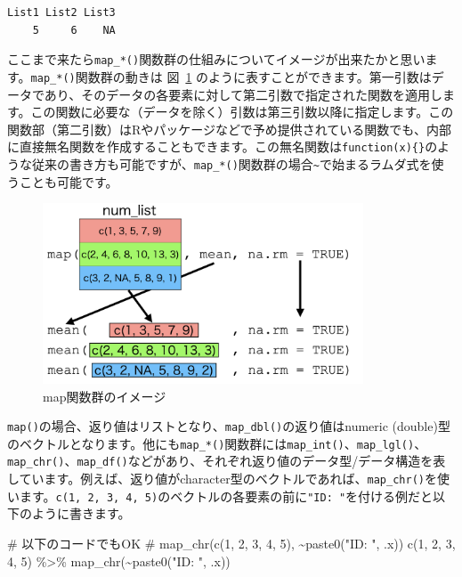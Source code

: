 \documentclass[
  a4paper,
  pandoc,
  ja=standard,
  jafont=haranoaji]{bxjsbook}
\newenvironment{Shaded}{\begin{snugshade}}{\end{snugshade}}
\newcommand{\CommentTok}[1]{\textcolor[rgb]{0.37,0.37,0.37}{#1}}
\newcommand{\DecValTok}[1]{\textcolor[rgb]{0.68,0.00,0.00}{#1}}
\newcommand{\FunctionTok}[1]{\textcolor[rgb]{0.28,0.35,0.67}{#1}}
\newcommand{\NormalTok}[1]{\textcolor[rgb]{0.00,0.48,0.65}{#1}}
\newcommand{\SpecialCharTok}[1]{\textcolor[rgb]{0.37,0.37,0.37}{#1}}
\newcommand{\StringTok}[1]{\textcolor[rgb]{0.13,0.47,0.30}{#1}}
\begin{document}
\begin{verbatim}
List1 List2 List3 
    5     6    NA 
\end{verbatim}

ここまで来たら\texttt{map\_*()}関数群の仕組みについてイメージが出来たかと思います。\texttt{map\_*()}関数群の動きは
図~\ref{fig-map_inside}
のように表すことができます。第一引数はデータであり、そのデータの各要素に対して第二引数で指定された関数を適用します。この関数に必要な（データを除く）引数は第三引数以降に指定します。この関数部（第二引数）はRやパッケージなどで予め提供されている関数でも、内部に直接無名関数を作成することもできます。この無名関数は\texttt{function(x)\{\}}のような従来の書き方も可能ですが、\texttt{map\_*()}関数群の場合\texttt{\textasciitilde{}}で始まるラムダ式を使うことも可能です。

\begin{figure}

{\centering \includegraphics[width=0.85\textwidth,height=\textheight]{./Figs/Iteration/map_inside.png}

}

\caption{\label{fig-map_inside}map関数群のイメージ}

\end{figure}

\texttt{map()}の場合、返り値はリストとなり、\texttt{map\_dbl()}の返り値はnumeric
(double)型のベクトルとなります。他にも\texttt{map\_*()}関数群には\texttt{map\_int()}、\texttt{map\_lgl()}、\texttt{map\_chr()}、\texttt{map\_df()}などがあり、それぞれ返り値のデータ型/データ構造を表しています。例えば、返り値がcharacter型のベクトルであれば、\texttt{map\_chr()}を使います。\texttt{c(1,\ 2,\ 3,\ 4,\ 5)}のベクトルの各要素の前に\texttt{"ID:\ "}を付ける例だと以下のように書きます。

\begin{Shaded}
\begin{Highlighting}[numbers=left,,]
\CommentTok{\# 以下のコードでもOK}
\CommentTok{\# map\_chr(c(1, 2, 3, 4, 5), \textasciitilde{}paste0("ID: ", .x))}
\FunctionTok{c}\NormalTok{(}\DecValTok{1}\NormalTok{, }\DecValTok{2}\NormalTok{, }\DecValTok{3}\NormalTok{, }\DecValTok{4}\NormalTok{, }\DecValTok{5}\NormalTok{) }\SpecialCharTok{\%\textgreater{}\%}
  \FunctionTok{map\_chr}\NormalTok{(}\SpecialCharTok{\textasciitilde{}}\FunctionTok{paste0}\NormalTok{(}\StringTok{"ID: "}\NormalTok{, .x))}
\end{Highlighting}
\end{Shaded}
\end{document}

